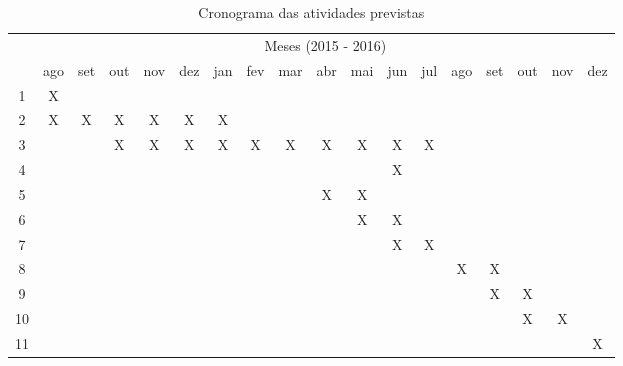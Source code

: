 \begin{table}[!htpb]
  \centering
  \begin{small}
    \setlength{\tabcolsep}{4pt}
    \begin{tabular}{|c|c|c|c|c|c|c|c|c|c|c|c|c|c|c|c|c|c|}\hline
     & \multicolumn{17}{c|}{Meses (2015 - 2016)}\\ \cline{2-18}
    \raisebox{1.5ex}{Etapa} & ago & set & out & nov & dez & jan & fev & mar & abr & mai & jun & jul & ago & set & out & nov & dez \\ \hline
    1 & X &   &   &   &   &   &   &   &   &   &   &   &   &   &   &   & \\ \hline
    2 & X & X & X & X & X & X &   &   &   &   &   &   &   &   &   &   & \\ \hline
    3 &   &   & X & X & X & X & X & X & X & X & X & X &   &   &   &   & \\ \hline
    4 &   &   &   &   &   &   &   &   &   &   & X &   &   &   &   &   & \\ \hline
    5 &   &   &   &   &   &   &   &   & X & X &   &   &   &   &   &   & \\ \hline
    6 &   &   &   &   &   &   &   &   &   & X & X &   &   &   &   &   & \\ \hline
    7 &   &   &   &   &   &   &   &   &   &   & X & X &   &   &   &   & \\ \hline
    8 &   &   &   &   &   &   &   &   &   &   &   &   & X & X &   &   & \\ \hline
    9 &   &   &   &   &   &   &   &   &   &   &   &   &   & X & X &   & \\ \hline
    10 &  &   &   &   &   &   &   &   &   &   &   &   &   &   & X & X & \\ \hline
    11 &  &   &   &   &   &   &   &   &   &   &   &   &   &   &   &   & X \\ \hline
    \end{tabular}
  \end{small}
  \caption{Cronograma das atividades previstas}
  \label{t_cronograma}
\end{table}

